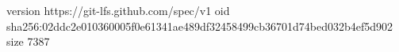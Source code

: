 version https://git-lfs.github.com/spec/v1
oid sha256:02ddc2e010360005f0e61341ae489df32458499cb36701d74bed032b4ef5d902
size 7387
